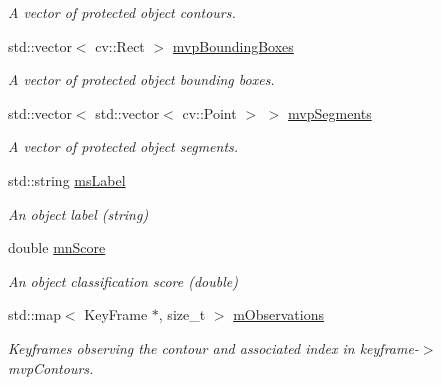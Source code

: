 \begin{DoxyCompactItemize}
\begin{DoxyCompactList}\small\item\em A vector of protected object contours. \end{DoxyCompactList}\item 
\mbox{\label{classObject_a36f268ec71e51829dd08acde6e7870fa}} 
std\+::vector$<$ cv\+::\+Rect $>$ \hyperlink{classObject_a36f268ec71e51829dd08acde6e7870fa}{mvp\+Bounding\+Boxes}
\begin{DoxyCompactList}\small\item\em A vector of protected object bounding boxes. \end{DoxyCompactList}\item 
\mbox{\label{classObject_ac908f68b5c3b6dcd4b85e4c104d8da1e}} 
std\+::vector$<$ std\+::vector$<$ cv\+::\+Point $>$ $>$ \hyperlink{classObject_ac908f68b5c3b6dcd4b85e4c104d8da1e}{mvp\+Segments}
\begin{DoxyCompactList}\small\item\em A vector of protected object segments. \end{DoxyCompactList}\item 
\mbox{\label{classObject_ae4d7dda62f7f9c2de88dc033237a33a9}} 
std\+::string \hyperlink{classObject_ae4d7dda62f7f9c2de88dc033237a33a9}{ms\+Label}
\begin{DoxyCompactList}\small\item\em An object label (string) \end{DoxyCompactList}\item 
\mbox{\label{classObject_a52bd65e542dc41796db6724b4611f8dd}} 
double \hyperlink{classObject_a52bd65e542dc41796db6724b4611f8dd}{mn\+Score}
\begin{DoxyCompactList}\small\item\em An object classification score (double) \end{DoxyCompactList}\item 
\mbox{\label{classObject_a29e81947a25883b9e7fdb3f5c4a84076}} 
std\+::map$<$ Key\+Frame $\ast$, size\+\_\+t $>$ \hyperlink{classObject_a29e81947a25883b9e7fdb3f5c4a84076}{m\+Observations}
\begin{DoxyCompactList}\small\item\em Keyframes observing the contour and associated index in keyframe-\/$>$mvp\+Contours. \end{DoxyCompactList}\item 

\end{DoxyCompactItemize}
